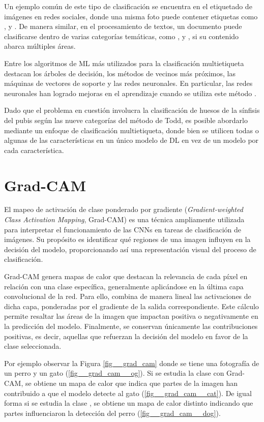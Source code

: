 Un ejemplo común de este tipo de clasificación se encuentra en el etiquetado de imágenes en redes sociales, donde una misma foto puede contener etiquetas como ,  y . De manera similar, en el procesamiento de textos, un documento puede clasificarse dentro de varias categorías temáticas, como ,  y , si su contenido abarca múltiples áreas.

Entre los algoritmos de ML más utilizados para la clasificación multietiqueta destacan los árboles de decisión, los métodos de vecinos más próximos, las máquinas de vectores de soporte y las redes neuronales. En particular, las redes neuronales han logrado mejoras en el aprendizaje cuando se utiliza este método \cite{ranjan_hyperface_2019}.

Dado que el problema en cuestión involucra la clasificación de huesos de la sínfisis del pubis según las nueve categorías del método de Todd, es posible abordarlo mediante un enfoque de clasificación multietiqueta, donde bien se utilicen todas o algunas de las características en un único modelo de DL en vez de un modelo por cada característica.

\section{Grad-CAM}
\label{section2:gradcam}
El mapeo de activación de clase ponderado por gradiente (\textit{Gradient-weighted Class Activation Mapping}, Grad-CAM) \cite{selvaraju_grad_cam_2017} es una técnica ampliamente utilizada para interpretar el funcionamiento de las CNNs en tareas de clasificación de imágenes. Su propósito es identificar qué regiones de una imagen influyen en la decisión del modelo, proporcionando así una representación visual del proceso de clasificación.

Grad-CAM genera mapas de calor que destacan la relevancia de cada píxel en relación con una clase específica, generalmente aplicándose en la última capa convolucional de la red. Para ello, combina de manera lineal las activaciones de dicha capa, ponderadas por el gradiente de la salida correspondiente. Este cálculo permite resaltar las áreas de la imagen que impactan positiva o negativamente en la predicción del modelo. Finalmente, se conservan únicamente las contribuciones positivas, es decir, aquellas que refuerzan la decisión del modelo en favor de la clase seleccionada.

Por ejemplo observar la Figura \ref{fig__grad_cam} donde se tiene una fotografía de un perro y un gato (\ref{fig__grad_cam__og}). Si se estudia la clase  con Grad-CAM, se obtiene un mapa de calor que indica que partes de la imagen han contribuido a que el modelo detecte al gato (\ref{fig__grad_cam__cat}). De igual forma si se estudia la clase , se obtiene un mapa de calor distinto indicando que partes influenciaron la detección del perro (\ref{fig__grad_cam__dog}).

